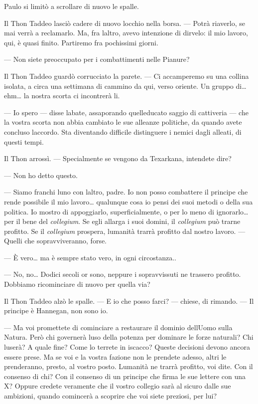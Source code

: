 Paulo si limitò a scrollare di nuovo le spalle.

Il Thon Taddeo lasciò cadere di nuovo l\textquotesingle occhio nella
borsa. --- Potrà riaverlo, se mai verrà a reclamarlo. Ma, fra
l\textquotesingle altro, avevo intenzione di dirvelo: il mio lavoro,
qui, è quasi finito. Partiremo fra pochissimi giorni.

--- Non siete preoccupato per i combattimenti nelle Pianure?

Il Thon Taddeo guardò corrucciato la parete. --- Ci accamperemo su una
collina isolata, a circa una settimana di cammino da qui, verso oriente.
Un gruppo di\ldots{} ehm\ldots{} la nostra scorta ci incontrerà li.

--- Io spero --- disse l\textquotesingle abate, assaporando
quell\textquotesingle educato saggio di cattiveria --- che la vostra
scorta non abbia cambiato le sue alleanze politiche, da quando avete
concluso l\textquotesingle accordo. Sta diventando difficile distinguere
i nemici dagli alleati, di questi tempi.

Il Thon arrossì. --- Specialmente se vengono da Texarkana, intendete
dire?

--- Non ho detto questo.

--- Siamo franchi l\textquotesingle uno con l\textquotesingle altro,
padre. Io non posso combattere il principe che rende possibile il mio
lavoro\ldots{} qualunque cosa io pensi dei suoi metodi o della sua
politica. Io mostro di appoggiarlo, superficialmente, o per lo meno di
ignorarlo\ldots{} per il bene del \emph{collegium}. Se egli allarga i
suoi domini, il \emph{collegium} può trarne profitto. Se il
\emph{collegium} prospera, l\textquotesingle umanità trarrà profitto dal
nostro lavoro. --- Quelli che sopravviveranno, forse.

--- È vero\ldots{} ma è sempre stato vero, in ogni circostanza..

--- No, no\ldots{} Dodici secoli or sono, neppure i sopravvissuti ne
trassero profitto. Dobbiamo ricominciare di nuovo per quella via?

Il Thon Taddeo alzò le spalle. --- E io che posso farci? --- chiese, di
rimando. --- Il principe è Hannegan, non sono io.

--- Ma voi promettete di cominciare a restaurare il dominio
dell\textquotesingle Uomo sulla Natura. Però chi governerà
l\textquotesingle uso della potenza per dominare le forze naturali? Chi
l\textquotesingle userà? A quale fine? Come lo terrete in iscacco?
Queste decisioni devono ancora essere prese. Ma se voi e la vostra
fazione non le prendete adesso, altri le prenderanno, presto, al vostro
posto. L\textquotesingle umanità ne trarrà profitto, voi dite. Con il
consenso di chi? Con il consenso di un principe che firma le sue lettere
con una X? Oppure credete veramente che il vostro collegio sarà al
sicuro dalle sue ambizioni, quando comincerà a scoprire che voi siete
preziosi, per lui?

